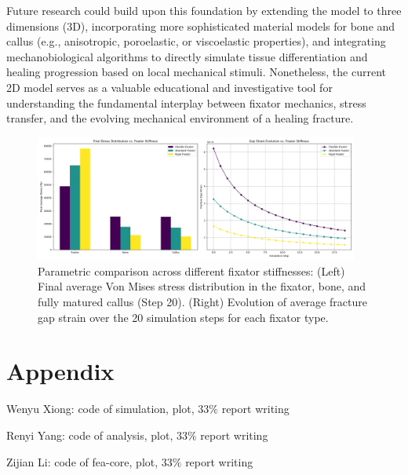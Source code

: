 \documentclass{article}
\begin{document}
Future research could build upon this foundation by extending the model to three dimensions (3D), incorporating more sophisticated material models for bone and callus (e.g., anisotropic, poroelastic, or viscoelastic properties), and integrating mechanobiological algorithms to directly simulate tissue differentiation and healing progression based on local mechanical stimuli. Nonetheless, the current 2D model serves as a valuable educational and investigative tool for understanding the fundamental interplay between fixator mechanics, stress transfer, and the evolving mechanical environment of a healing fracture.

\begin{figure}[H]
  \centering
  \includegraphics[width=0.95\textwidth]{../output_advanced/parametric_comparison.png}
  \caption{Parametric comparison across different fixator stiffnesses: (Left) Final average Von Mises stress distribution in the fixator, bone, and fully matured callus (Step 20). (Right) Evolution of average fracture gap strain over the 20 simulation steps for each fixator type.}
  \label{fig:parametric_comparison}
\end{figure}

\section{Appendix}

Wenyu Xiong: code of simulation, plot, 33$\%$ report writing

Renyi Yang: code of analysis, plot, 33$\%$ report writing

Zijian Li: code of fea-core, plot, 33$\%$ report writing



\end{document}
